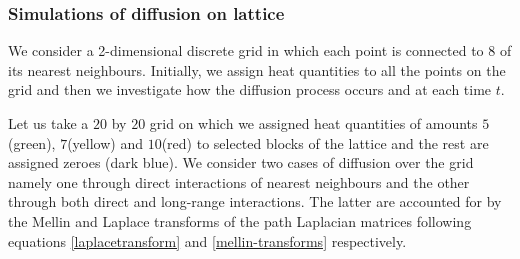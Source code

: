 \documentclass[10pt,a4paper]{article}
\theoremstyle{plain}
\theoremstyle{definition}
\begin{document}
    \subsubsection{Simulations of diffusion on lattice}
    We consider a 2-dimensional discrete grid in which each point is connected to 8 of its nearest neighbours. Initially, we assign heat quantities to all the points on the grid and then we investigate how the diffusion process occurs and at each time $t$. 
    
    Let us take a $20$ by $20$ grid on which we assigned heat quantities of amounts $5$(green), $7$(yellow) and $10$(red) to selected blocks of the lattice and the rest are assigned zeroes (dark blue). We consider two cases of diffusion over the grid namely one through direct interactions of nearest neighbours and the other through both direct and long-range interactions. The latter are accounted for by the Mellin and Laplace transforms of the path Laplacian matrices following equations \ref{laplacetransform} and \ref{mellin-transforms} respectively.
    
\end{document}
